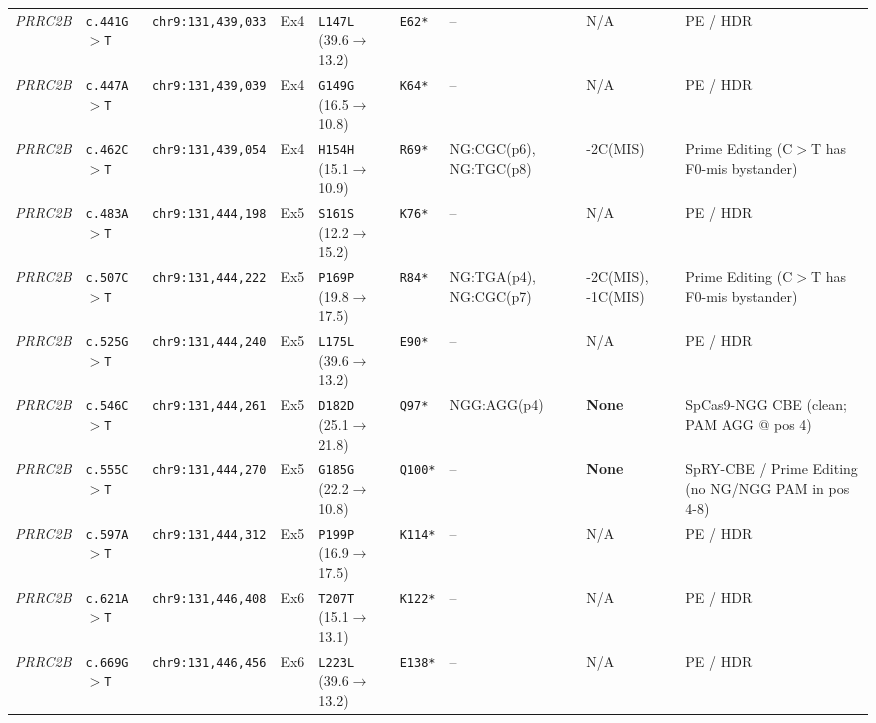 \documentclass[10pt,letterpaper]{article}
\newcommand{\gene}[1]{\textit{#1}}
\begin{document}
{\begin{longtable}{@{}lllllllll@{}}
\gene{PRRC2B} & \texttt{c.441G$>$T} & \texttt{chr9:131,439,033} & Ex4 & \texttt{L147L} (39.6$\rightarrow$13.2) & \texttt{E62*} & -- & N/A & PE / HDR \\
\gene{PRRC2B} & \texttt{c.447A$>$T} & \texttt{chr9:131,439,039} & Ex4 & \texttt{G149G} (16.5$\rightarrow$10.8) & \texttt{K64*} & -- & N/A & PE / HDR \\
\gene{PRRC2B} & \texttt{c.462C$>$T} & \texttt{chr9:131,439,054} & Ex4 & \texttt{H154H} (15.1$\rightarrow$10.9) & \texttt{R69*} & NG:CGC(p6), NG:TGC(p8) & -2C(MIS) & Prime Editing (C$>$T has F0-mis bystander) \\
\gene{PRRC2B} & \texttt{c.483A$>$T} & \texttt{chr9:131,444,198} & Ex5 & \texttt{S161S} (12.2$\rightarrow$15.2) & \texttt{K76*} & -- & N/A & PE / HDR \\
\gene{PRRC2B} & \texttt{c.507C$>$T} & \texttt{chr9:131,444,222} & Ex5 & \texttt{P169P} (19.8$\rightarrow$17.5) & \texttt{R84*} & NG:TGA(p4), NG:CGC(p7) & -2C(MIS), -1C(MIS) & Prime Editing (C$>$T has F0-mis bystander) \\
\gene{PRRC2B} & \texttt{c.525G$>$T} & \texttt{chr9:131,444,240} & Ex5 & \texttt{L175L} (39.6$\rightarrow$13.2) & \texttt{E90*} & -- & N/A & PE / HDR \\
\gene{PRRC2B} & \texttt{c.546C$>$T} & \texttt{chr9:131,444,261} & Ex5 & \texttt{D182D} (25.1$\rightarrow$21.8) & \texttt{Q97*} & NGG:AGG(p4) & \textbf{None} & SpCas9-NGG CBE (clean; PAM AGG @ pos 4) \\
\gene{PRRC2B} & \texttt{c.555C$>$T} & \texttt{chr9:131,444,270} & Ex5 & \texttt{G185G} (22.2$\rightarrow$10.8) & \texttt{Q100*} & -- & \textbf{None} & SpRY-CBE / Prime Editing (no NG/NGG PAM in pos 4-8) \\
\gene{PRRC2B} & \texttt{c.597A$>$T} & \texttt{chr9:131,444,312} & Ex5 & \texttt{P199P} (16.9$\rightarrow$17.5) & \texttt{K114*} & -- & N/A & PE / HDR \\
\gene{PRRC2B} & \texttt{c.621A$>$T} & \texttt{chr9:131,446,408} & Ex6 & \texttt{T207T} (15.1$\rightarrow$13.1) & \texttt{K122*} & -- & N/A & PE / HDR \\
\gene{PRRC2B} & \texttt{c.669G$>$T} & \texttt{chr9:131,446,456} & Ex6 & \texttt{L223L} (39.6$\rightarrow$13.2) & \texttt{E138*} & -- & N/A & PE / HDR \\
\end{longtable}
}
\end{document}
